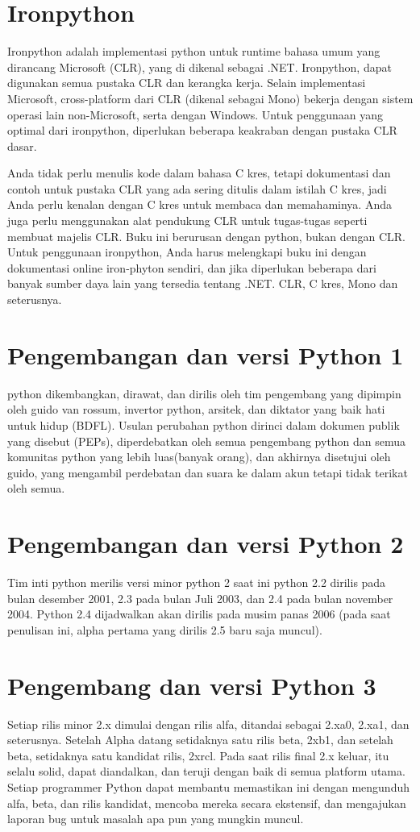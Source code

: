 \documentclass[12pt, times new roman, a4paper]{article}
\begin{document}
\section{Ironpython}
Ironpython adalah implementasi python untuk runtime bahasa umum yang dirancang Microsoft (CLR), yang di dikenal sebagai .NET. Ironpython, dapat digunakan semua pustaka CLR dan kerangka kerja. Selain implementasi Microsoft, cross-platform dari CLR (dikenal sebagai Mono) bekerja dengan sistem operasi lain non-Microsoft, serta dengan Windows. Untuk penggunaan yang optimal dari ironpython, diperlukan beberapa keakraban dengan pustaka CLR dasar.

Anda tidak perlu menulis kode dalam bahasa C kres, tetapi dokumentasi dan contoh untuk pustaka CLR yang ada sering ditulis dalam istilah C kres, jadi Anda perlu kenalan dengan C kres untuk membaca dan memahaminya. Anda juga perlu menggunakan alat pendukung CLR untuk tugas-tugas seperti membuat majelis CLR. Buku ini berurusan dengan python, bukan dengan CLR. Untuk penggunaan ironpython, Anda harus melengkapi buku ini dengan dokumentasi online iron-phyton sendiri, dan jika diperlukan beberapa dari banyak sumber daya lain yang tersedia tentang .NET. CLR, C kres, Mono dan seterusnya.

\section{Pengembangan dan versi Python 1}
python dikembangkan, dirawat, dan dirilis oleh tim pengembang yang dipimpin oleh guido van rossum, invertor python, arsitek, dan diktator yang baik hati untuk hidup (BDFL). Usulan perubahan python dirinci dalam dokumen publik yang disebut (PEPs), diperdebatkan oleh semua pengembang python dan semua komunitas python yang lebih luas(banyak orang), dan akhirnya disetujui oleh guido, yang mengambil perdebatan dan suara ke dalam akun tetapi tidak terikat oleh semua.

\section{Pengembangan dan versi Python 2}
Tim inti python merilis versi minor python 2 saat ini python 2.2 dirilis pada bulan desember 2001, 2.3 pada bulan Juli 2003, dan 2.4 pada bulan november 2004. Python 2.4 dijadwalkan akan dirilis pada musim panas 2006 (pada saat penulisan ini, alpha pertama yang dirilis 2.5 baru saja muncul).


\section{Pengembang dan versi Python 3}
Setiap rilis minor 2.x dimulai dengan rilis alfa, ditandai sebagai 2.xa0, 2.xa1, dan seterusnya. Setelah Alpha datang setidaknya satu rilis beta, 2xb1, dan setelah beta, setidaknya satu kandidat rilis, 2xrcl. Pada saat rilis final 2.x keluar, itu selalu solid, dapat diandalkan, dan teruji dengan baik di semua platform utama. Setiap programmer Python dapat membantu memastikan ini dengan mengunduh alfa, beta, dan rilis kandidat, mencoba mereka secara ekstensif, dan mengajukan laporan bug untuk masalah apa pun yang mungkin muncul.
\end{document}
